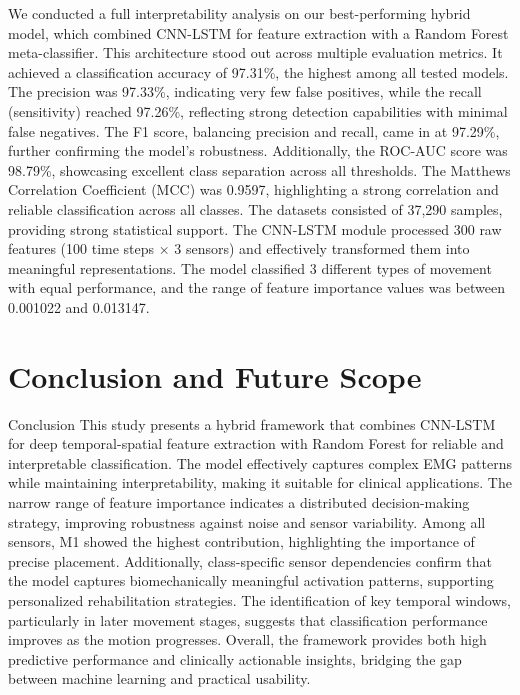 \documentclass{elektr}
\begin{document}
We conducted a full interpretability analysis on our best-performing hybrid model, which combined CNN-LSTM for feature extraction with a Random Forest meta-classifier. This architecture stood out across multiple evaluation metrics. It achieved a classification accuracy of 97.31\%, the highest among all tested models. The precision was 97.33\%, indicating very few false positives, while the recall (sensitivity) reached 97.26\%, reflecting strong detection capabilities with minimal false negatives. The F1 score, balancing precision and recall, came in at 97.29\%, further confirming the model’s robustness. Additionally, the ROC-AUC score was 98.79\%, showcasing excellent class separation across all thresholds. The Matthews Correlation Coefficient (MCC) was 0.9597, highlighting a strong correlation and reliable classification across all classes. The datasets consisted of 37,290 samples, providing strong statistical support. The CNN-LSTM module processed 300 raw features (100 time steps × 3 sensors) and effectively transformed them into meaningful representations. The model classified 3 different types of movement with equal performance, and the range of feature importance values was between 0.001022 and 0.013147.

\section{Conclusion and Future Scope}

Conclusion
This study presents a hybrid framework that combines CNN-LSTM for deep temporal-spatial feature extraction with Random Forest for reliable and interpretable classification. The model effectively captures complex EMG patterns while maintaining interpretability, making it suitable for clinical applications. The narrow range of feature importance indicates a distributed decision-making strategy, improving robustness against noise and sensor variability. Among all sensors, M1 showed the highest contribution, highlighting the importance of precise placement. Additionally, class-specific sensor dependencies confirm that the model captures biomechanically meaningful activation patterns, supporting personalized rehabilitation strategies. The identification of key temporal windows, particularly in later movement stages, suggests that classification performance improves as the motion progresses. Overall, the framework provides both high predictive performance and clinically actionable insights, bridging the gap between machine learning and practical usability.
\end{document}
